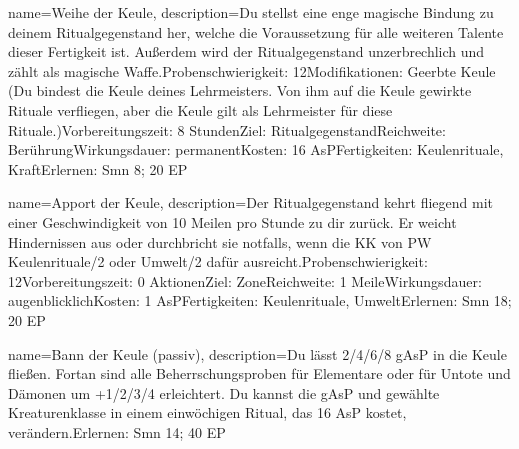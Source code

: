 {
    name={Weihe der Keule},
    description={Du stellst eine enge magische Bindung zu deinem Ritualgegenstand her, welche die Voraussetzung für alle weiteren Talente dieser Fertigkeit ist. Außerdem wird der Ritualgegenstand unzerbrechlich und zählt als magische Waffe.\newline Probenschwierigkeit: 12\newline Modifikationen: Geerbte Keule (Du bindest die Keule deines Lehrmeisters. Von ihm auf die Keule gewirkte Rituale verfliegen, aber die Keule gilt als Lehrmeister für diese Rituale.)\newline Vorbereitungszeit: 8 Stunden\newline Ziel: Ritualgegenstand\newline Reichweite: Berührung\newline Wirkungsdauer: permanent\newline Kosten: 16 AsP\newline Fertigkeiten: Keulenrituale, Kraft\newline Erlernen: Smn 8; 20 EP}
}


{
    name={Apport der Keule},
    description={Der Ritualgegenstand kehrt fliegend mit einer Geschwindigkeit von 10 Meilen pro Stunde zu dir zurück. Er weicht Hindernissen aus oder durchbricht sie notfalls, wenn die KK von PW Keulenrituale/2 oder Umwelt/2 dafür ausreicht.\newline Probenschwierigkeit: 12\newline Vorbereitungszeit: 0 Aktionen\newline Ziel: Zone\newline Reichweite: 1 Meile\newline Wirkungsdauer: augenblicklich\newline Kosten: 1 AsP\newline Fertigkeiten: Keulenrituale, Umwelt\newline Erlernen: Smn 18; 20 EP}
}


{
    name={Bann der Keule (passiv)},
    description={Du lässt 2/4/6/8 gAsP in die Keule fließen. Fortan sind alle Beherrschungsproben für Elementare oder für Untote und Dämonen um +1/2/3/4 erleichtert. Du kannst die gAsP und gewählte Kreaturenklasse in einem einwöchigen Ritual, das 16 AsP kostet, verändern.\newline Erlernen: Smn 14; 40 EP}
}


